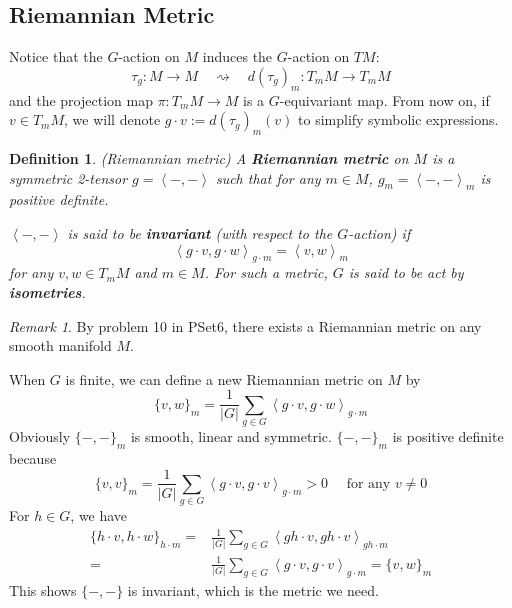 \documentclass[reqno,11pt]{amsart}
\numberwithin{equation}{section}
\theoremstyle{plain}
\newtheorem{defn}[theorem]{Definition}
\theoremstyle{plain}
\numberwithin{equation}{section}
\theoremstyle{remark}
\newtheorem{remark}[theorem]{Remark}
\begin{document}
\subsection{Riemannian Metric}
Notice that the $G$-action on $M$ induces the $G$-action on $TM$:
$$\tau_g:M \longrightarrow M \quad\rightsquigarrow\quad d(\tau_g)_m:T_mM \longrightarrow T_mM$$
and the projection map $\pi:T_mM \rightarrow M$ is a $G$-equivariant map. From now on, if $v \in T_mM$, we will denote $g\cdot v:=d(\tau_g)_m(v)$ to simplify symbolic expressions.
\begin{defn}(Riemannian metric)
	A \textbf{Riemannian metric} on $M$ is a symmetric 2-tensor $g=\left<-,-\right>$ such that for any $m \in M$, $g_m=\left<-,-\right>_m$ is positive definite.
	
	$\left<-,-\right>$ is said to be \textbf{invariant} (with respect to the $G$-action) if
	$$\left<g\cdot v,g\cdot w\right>_{g \cdot m}=\left<v,w\right>_m$$
	for any $v,w \in T_mM$ and $m \in M$. For such a metric, $G$ is said to be act by \textbf{isometries}.
\end{defn}
\begin{remark}
	By problem 10 in PSet6, there exists a Riemannian metric on any smooth manifold $M$.
\end{remark}
When $G$ is finite, we can define a new Riemannian metric on $M$ by
\begin{equation}
\{v,w\}_m=\frac{1}{|G|}\sum_{g \in G} \left<g \cdot v,g\cdot w\right>_{g\cdot m}
\label{eq:riemet}
\end{equation}
Obviously $\{-,-\}_m$ is smooth, linear and symmetric. $\{-,-\}_m$ is positive definite because
 $$\{v,v\}_m=\frac{1}{|G|}\sum_{g \in G} \left<g \cdot v,g\cdot v\right>_{g\cdot m}>0 \quad \text{ for any } v \neq 0$$
For $h \in G$, we have
\begin{equation*}
\begin{aligned}
	\{h\cdot v,h \cdot w\}_{h \cdot m}=&\frac{1}{|G|}\sum_{g \in G} \left<gh \cdot v,gh\cdot v\right>_{gh\cdot m}\\
	=&\frac{1}{|G|}\sum_{g \in G} \left<g \cdot v,g\cdot v\right>_{g\cdot m}=\{v,w\}_m
\end{aligned}
\end{equation*}
This shows $\{-,-\}$ is invariant, which is the metric we need.
\end{document}
